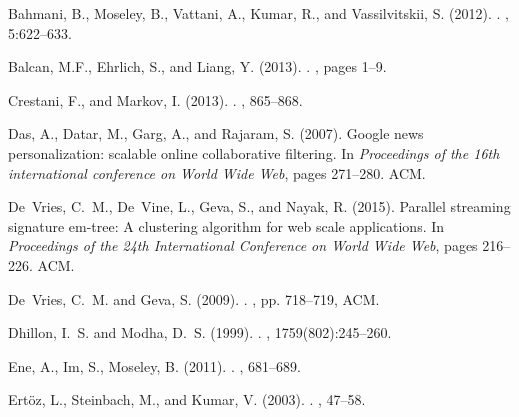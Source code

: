 \documentclass[10pt]{article}
\begin{document}
\newpage

% 
\begin{thebibliography}{}

Bahmani, B., Moseley, B., Vattani, A., Kumar, R., and Vassilvitskii, S. (2012).
.
, 5:622--633.

Balcan, M.F., Ehrlich, S., and Liang, Y. (2013).
.
, pages 1--9.

Crestani, F., and Markov, I. (2013).
.
, 865--868.

Das, A., Datar, M., Garg, A., and Rajaram, S. (2007).
\newblock Google news personalization: scalable online collaborative filtering.
\newblock In {\em Proceedings of the 16th international conference on World
  Wide Web}, pages 271--280. ACM.

De~Vries, C.~M., De~Vine, L., Geva, S., and Nayak, R. (2015).
\newblock Parallel streaming signature em-tree: A clustering algorithm for web
  scale applications.
\newblock In {\em Proceedings of the 24th International Conference on World
  Wide Web}, pages 216--226. ACM.


De~Vries, C.~M. and Geva, S. (2009).
.
, pp. 718--719, ACM.

Dhillon, I.~S. and Modha, D.~S. (1999).
.
, 1759(802):245--260.

Ene, A., Im, S., Moseley, B. (2011).
.
, 681--689.

Ert{\"o}z, L., Steinbach, M., and Kumar, V. (2003).
.
, 47--58.


\end{thebibliography}
\end{document}
